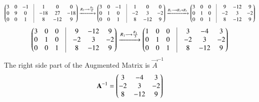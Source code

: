\documentclass[journal,12pt,onecolumn]{IEEEtran}
\theoremstyle{remark}
\begin{document}
\begin{align}
 \myvec{3&0&-1 &\vrule& 1&0&0 \\
       0&9&0 &\vrule&  -18&27&-18 \\
       0&0&1 &\vrule&  8&-12&9} \xrightarrow{R_2 \longrightarrow \frac{R_2}{9}}
        \myvec{3&0&-1 &\vrule& 1&0&0 \\
       0&1&0 &\vrule&  -2&3&-2 \\
       0&0&1 &\vrule&  8&-12&9} \xrightarrow{R_1 \longrightarrow R_1+R_3}
        \myvec{3&0&0 &\vrule& 9&-12&9 \\
       0&1&0 &\vrule&  -2&3&-2 \\
       0&0&1 &\vrule&  8&-12&9} 
\end{align}
\begin{align}
\myvec{3&0&0 &\vrule& 9&-12&9 \\
       0&1&0 &\vrule&  -2&3&-2 \\
       0&0&1 &\vrule&  8&-12&9} \xrightarrow{R_1 \longrightarrow \frac{R_1}{3}}
       \myvec{1&0&0 &\vrule& 3&-4&3 \\
       0&1&0 &\vrule&  -2&3&-2 \\
       0&0&1 &\vrule&  8&-12&9} 
\end{align}
The right side part of the Augmented Matrix is $\vec{A}^{-1}$
\begin{align}
\mathbf{A}^{-1} = \begin{pmatrix}3&-4&3\\
                      -2&3&-2\\
                      8&-12&9\end{pmatrix}
\end{align}
\end{document}

